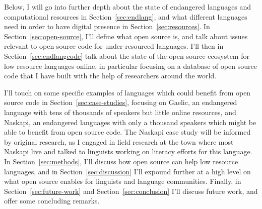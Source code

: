 Below, I will go into further depth about the state of endangered languages and computational resources in Section~\ref{sec:endlang}, and what different languages need in order to have digital presence in Section~\ref{sec:resources}. In Section~\ref{sec:open-source}, I'll define what open source is, and talk about issues relevant to open source code for under-resourced languages. I'll then in Section~\ref{sec:endlangcode} talk about the state of the open source ecosystem for low resource languages online, in particular focusing on a database of open source code that I have built with the help of researchers around the world.

I'll touch on some specific examples of languages which could benefit from open source code in Section~\ref{sec:case-studies}, focusing on Gaelic, an endangered language with tens of thousands of speakers but little online resources, and Naskapi, an endangered languages with only a thousand speakers which might be able to benefit from open source code. The Naskapi case study will be informed by original research, as I engaged in field research at the town where most Naskapi live and talked to linguists working on literacy efforts for this language. In Section~\ref{sec:methods}, I'll discuss how open source can help low resource languages, and in Section~\ref{sec:discussion} I'll expound further at a high level on what open source enables for linguists and language communities. Finally, in Section~\ref{sec:future-work} and Section~\ref{sec:conclusion} I'll discuss future work, and offer some concluding remarks.

